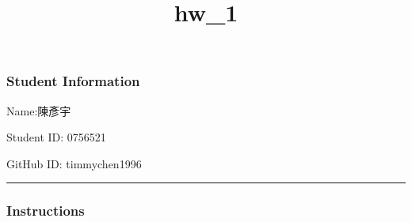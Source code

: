 \documentclass[11pt]{article}
\title{hw\_1}
\begin{document}
    
    
    \maketitle
    
    

    
    \subsubsection{Student Information}\label{student-information}

Name:陳彥宇

Student ID: 0756521

GitHub ID: timmychen1996

    \begin{center}\rule{0.5\linewidth}{\linethickness}\end{center}

    \subsubsection{Instructions}\label{instructions}
\end{document}
